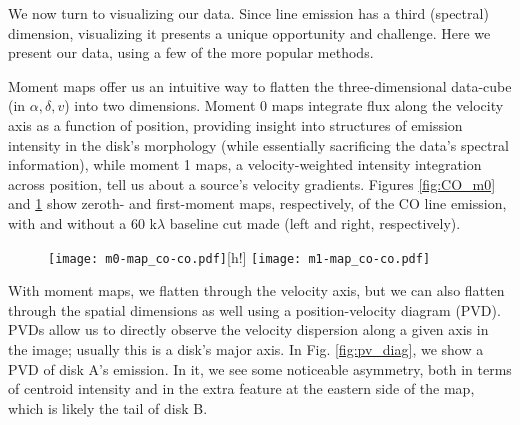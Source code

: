 We now turn to visualizing our data. Since line emission has a third (spectral) dimension, visualizing it presents a unique opportunity and challenge. Here we present our data, using a few of the more popular methods.


Moment maps offer us an intuitive way to flatten the three-dimensional data-cube (in $\alpha, \delta, v$) into two dimensions. Moment 0 maps integrate flux along the velocity axis as a function of position, providing insight into structures of emission intensity in the disk's morphology (while essentially sacrificing the data's spectral information), while moment 1 maps, a velocity-weighted intensity integration across position, tell us about a source's velocity gradients. Figures \ref{fig:CO_m0} and \ref{fig:CO_m1} show zeroth- and first-moment maps, respectively, of the CO line emission, with and without a 60 k$\lambda$ baseline cut made (left and right, respectively).

\begin{figure}
\centering
\texttt{[image: m0-map\_co-co.pdf]}[h!]
  \label{fig:CO_m0}
  \texttt{[image: m1-map\_co-co.pdf]}
  \label{fig:CO_m1}
\end{figure}



With moment maps, we flatten through the velocity axis, but we can also flatten through the spatial dimensions as well using a position-velocity diagram (PVD). PVDs allow us to directly observe the velocity dispersion along a given axis in the image; usually this is a disk's major axis. In Fig. \ref{fig:pv_diag}, we show a PVD of disk A's \hco emission. In it, we see some noticeable asymmetry, both in terms of centroid intensity and in the extra feature at the eastern side of the map, which is likely the tail of disk B.

